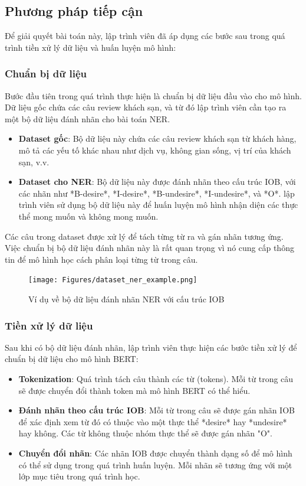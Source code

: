 \subsection{Phương pháp tiếp cận}
Để giải quyết bài toán này, lập trình viên đã áp dụng các bước sau trong quá trình tiền xử lý dữ liệu và huấn luyện mô hình:

\subsubsection{Chuẩn bị dữ liệu}
Bước đầu tiên trong quá trình thực hiện là chuẩn bị dữ liệu đầu vào cho mô hình. Dữ liệu gốc chứa các câu review khách sạn, và từ đó lập trình viên cần tạo ra một bộ dữ liệu đánh nhãn cho bài toán NER.

\begin{itemize}
    \item \textbf{Dataset gốc}: Bộ dữ liệu này chứa các câu review khách sạn từ khách hàng, mô tả các yếu tố khác nhau như dịch vụ, không gian sống, vị trí của khách sạn, v.v.
    \item \textbf{Dataset cho NER}: Bộ dữ liệu này được đánh nhãn theo cấu trúc IOB, với các nhãn như *B-desire*, *I-desire*, *B-undesire*, *I-undesire*, và *O*. lập trình viên sử dụng bộ dữ liệu này để huấn luyện mô hình nhận diện các thực thể mong muốn và không mong muốn.
\end{itemize}

Các câu trong dataset được xử lý để tách từng từ ra và gán nhãn tương ứng. Việc chuẩn bị bộ dữ liệu đánh nhãn này là rất quan trọng vì nó cung cấp thông tin để mô hình học cách phân loại từng từ trong câu.

\begin{figure}[H]
    \centering
    \texttt{[image: Figures/dataset\_ner\_example.png]}
    \caption{Ví dụ về bộ dữ liệu đánh nhãn NER với cấu trúc IOB}
\end{figure}

\subsubsection{Tiền xử lý dữ liệu}
Sau khi có bộ dữ liệu đánh nhãn, lập trình viên thực hiện các bước tiền xử lý để chuẩn bị dữ liệu cho mô hình BERT:
\begin{itemize}
    \item \textbf{Tokenization}: Quá trình tách câu thành các từ (tokens). Mỗi từ trong câu sẽ được chuyển đổi thành token mà mô hình BERT có thể hiểu.
    \item \textbf{Đánh nhãn theo cấu trúc IOB}: Mỗi từ trong câu sẽ được gán nhãn IOB để xác định xem từ đó có thuộc vào một thực thể *desire* hay *undesire* hay không. Các từ không thuộc nhóm thực thể sẽ được gán nhãn "O".
    \item \textbf{Chuyển đổi nhãn}: Các nhãn IOB được chuyển thành dạng số để mô hình có thể sử dụng trong quá trình huấn luyện. Mỗi nhãn sẽ tương ứng với một lớp mục tiêu trong quá trình học.
\end{itemize}

